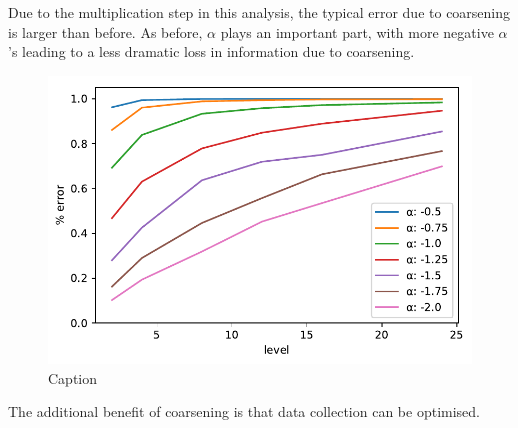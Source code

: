 \documentclass{acm_proc_article-sp}
\begin{document}
Due to the multiplication step in this analysis, the typical error due to coarsening is larger than before. As before, $\alpha$ plays an important part, with more negative $\alpha$'s leading to a less dramatic loss in information due to coarsening.

\begin{figure}[h]
\begin{center}
\includegraphics[width=0.8\columnwidth]{Results/plotProductSpatialTemporalFieldsViaCoarsening.pdf}
\caption[Small caption]{Caption}
\label{fig:plotProductSpatialTemporalFieldsViaCoarsening}
\end{center}
\end{figure}
The additional benefit of coarsening is that data collection can be optimised.
\end{document}
